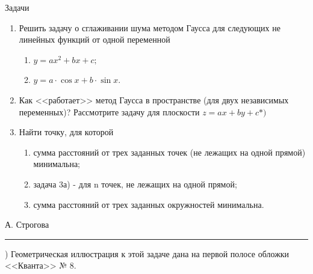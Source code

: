 \begin{multicols}{2}
	    Задачи
	    \begin{enumerate}
	        \item Решить задачу о сглаживании шума методом Гаусса для следующих не линейных функций от одной переменной
	        \begin{enumerate}
	            \item $y=ax^2+bx+c;$
	            \item $y = a\cdot \cos x + b \cdot \sin x .$
	        \end{enumerate}
	        \item Как <<работает>> метод Гаусса в пространстве (для двух независимых переменных)? Рассмотрите задачу для плоскости $z = ax +by +c *)$
	        \item Найти точку, для которой 
	        \begin{enumerate}
	            \item сумма расстояний от трех заданных точек (не лежащих на одной прямой) минимальна;
	            \item задача 3а) - для n точек, не лежащих на одной прямой;
	            \item сумма расстояний от трех заданных окружностей минимальна.
	        \end{enumerate}
	    \end{enumerate}
	    \begin{flushright}
	    А. Строгова
	    \end{flushright}
	    \begin{center}
        \rule{280 pt}{0,4 pt} %
        \end{center}
	    \par *) Геометрическая иллюстрация к этой задаче дана на первой полосе обложки <<Кванта>> № 8.
    \end{multicols}

